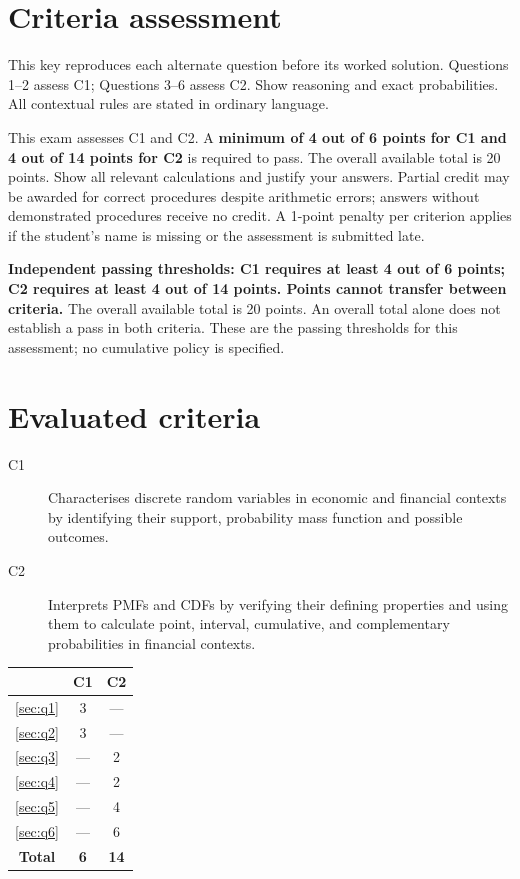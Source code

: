 \section*{Criteria assessment}
This key reproduces each alternate question before its worked solution. Questions 1--2 assess C1; Questions 3--6 assess C2. Show reasoning and exact probabilities. All contextual rules are stated in ordinary language.

This exam assesses C1 and C2. A \textbf{minimum of 4 out of 6 points for C1 and 4 out of 14 points for C2} is required to pass. The overall available total is 20 points. Show all relevant calculations and justify your answers. Partial credit may be awarded for correct procedures despite arithmetic errors; answers without demonstrated procedures receive no credit. A 1-point penalty per criterion applies if the student's name is missing or the assessment is submitted late.

\textbf{Independent passing thresholds: C1 requires at least 4 out of 6 points; C2 requires at least 4 out of 14 points. Points cannot transfer between criteria.} The overall available total is 20 points. An overall total alone does not establish a pass in both criteria. These are the passing thresholds for this assessment; no cumulative policy is specified.
\section*{Evaluated criteria}
\begin{description}
\item[C1] Characterises discrete random variables in economic and financial contexts by identifying their support, probability mass function and possible outcomes.
\item[C2] Interprets PMFs and CDFs by verifying their defining properties and using them to calculate point, interval, cumulative, and complementary probabilities in financial contexts.
\end{description}

\begin{center}
\begin{tabular}{|c|c|c|}
	\hline\textbf{\textnumero} & \textbf{C1} & \textbf{C2} \\ \hline
	\ref*{sec:q1} & 3 & --- \\\hline
	\ref*{sec:q2} & 3 & --- \\\hline
	\ref*{sec:q3} & --- & 2 \\\hline
	\ref*{sec:q4} & --- & 2 \\\hline
	\ref*{sec:q5} & --- & 4 \\\hline
	\ref*{sec:q6} & --- & 6 \\\hline
	\textbf{Total} & \textbf{6} & \textbf{14} \\\hline
\end{tabular}
\end{center}

